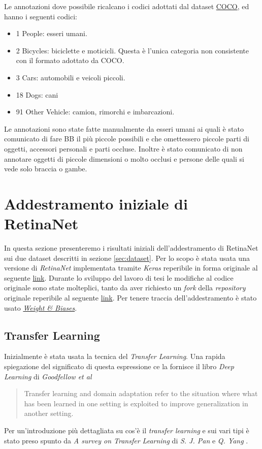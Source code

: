Le annotazioni dove possibile ricalcano i codici adottati dal dataset \href{http://cocodataset.org/}{COCO}, ed hanno i seguenti codici:
\begin{itemize}
    \item 1 People: esseri umani.
    \item 2 Bicycles: biciclette e moticicli. Questa è l'unica categoria non consistente con il formato adottato da COCO.
    \item 3 Cars: automobili e veicoli piccoli.
    \item 18 Dogs: cani 
    \item 91 Other Vehicle: camion, rimorchi e imbarcazioni.
\end{itemize}

Le annotazioni sono state fatte manualmente da esseri umani ai quali è stato comunicato di fare \ac{BB} il più piccole possibili e che omettessero piccole parti di oggetti, accessori personali e parti occluse. Inoltre è stato comunicato di non annotare oggetti di piccole dimensioni o molto occlusi e persone delle quali si vede solo braccia o gambe.

\section{Addestramento iniziale di RetinaNet}
\label{sec:addestramento_iniziale_di_retinanet}
In questa sezione presenteremo i risultati iniziali dell'addestramento di RetinaNet sui due dataset descritti in sezione \ref{sec:dataset}. Per lo scopo è stata usata una versione di \textit{RetinaNet} implementata tramite \textit{Keras} reperibile in forma originale al seguente \href{https://github.com/fizyr/keras-retinanet}{link}. Durante lo sviluppo del lavoro di tesi le modifiche al codice originale sono state molteplici, tanto da aver richiesto un \textit{fork} della \textit{repository} originale reperibile al seguente \href{https://github.com/iskorini/keras-retinanet}{link}. Per tenere traccia dell'addestramento è stato usato \href{https://www.wandb.com}{\textit{Weight \& Biases}}.
\subsection{Transfer Learning}
\label{subsec:transfer_learning}
Inizialmente è stata usata la tecnica del \textit{Transfer Learning}. Una rapida spiegazione del significato di questa espressione ce la fornisce il libro \textit{Deep Learning} di \textit{Goodfellow et al} \cite{Goodfellow-et-al-2016}
\begin{quote}
    Transfer learning and domain adaptation refer to the situation where what has been learned in one setting is exploited to improve generalization in another setting.
\end{quote}
Per un'introduzione più dettagliata su cos'è il \textit{transfer learning} e sui vari tipi è stato preso spunto da \textit{A survey on Transfer Learning} di \textit{S. J. Pan} e \textit{Q. Yang} \cite{5288526}. 

